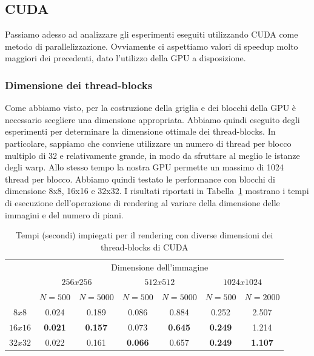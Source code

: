 \subsection{CUDA}\label{subsec:test_cuda}
Passiamo adesso ad analizzare gli esperimenti eseguiti utilizzando CUDA come metodo di parallelizzazione.
Ovviamente ci aspettiamo valori di speedup molto maggiori dei precedenti, dato l'utilizzo della GPU a disposizione.

\subsubsection{Dimensione dei thread-blocks}
Come abbiamo visto, per la costruzione della griglia e dei blocchi della GPU è necessario scegliere una dimensione appropriata.
Abbiamo quindi eseguito degli esperimenti per determinare la dimensione ottimale dei thread-blocks.
In particolare, sappiamo che conviene utilizzare un numero di thread per blocco multiplo di 32 e relativamente grande,
in modo da sfruttare al meglio le istanze degli warp.
Allo stesso tempo la nostra GPU permette un massimo di 1024 thread per blocco.
Abbiamo quindi testato le performance con blocchi di dimensione 8x8, 16x16 e 32x32.
I risultati riportati in Tabella~\ref{tab:cuda_blocks} mostrano i tempi di esecuzione dell'operazione di rendering al
variare della dimensione delle immagini e del numero di piani.
\begin{table}[H]
    \centering
    \begin{tabular}{c|c|c|c|c|c|c|}
        & \multicolumn{6}{|c|}{Dimensione dell'immagine} \\
        & \multicolumn{2}{|c|}{$256x256$} & \multicolumn{2}{|c|}{$512x512$} & \multicolumn{2}{|c|}{$1024x1024$} \\
        & $N=500$ & $N=5000$ & $N=500$ & $N=5000$ & $N=500$ & $N=2000$ \\
        \hline
        $8x8$ & 0.024 & 0.189 & 0.086 & 0.884 & 0.252 & 2.507\\
        $16x16$ & \textbf{0.021} & \textbf{0.157} & 0.073 & \textbf{0.645} & \textbf{0.249} & 1.214\\
        $32x32$ & 0.022 & 0.161 & \textbf{0.066} & 0.657 & \textbf{0.249} & \textbf{1.107} \\
    \end{tabular}
    \caption{\label{tab:cuda_blocks}Tempi (secondi) impiegati per il rendering con diverse dimensioni dei thread-blocks di CUDA}
\end{table}

